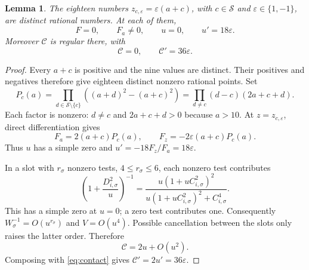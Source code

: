 \documentclass[11pt,a4paper]{article}
\newtheorem{lemma}[theorem]{Lemma}
\begin{document}
\begin{lemma}\label{lem:contacts}
The eighteen numbers $z_{c,\varepsilon}=\varepsilon(a+c)$,
with $c\in\mathcal S$ and $\varepsilon\in\{1,-1\}$, are
distinct rational numbers. At each of them,
\[
 F=0,\qquad F_a\ne0,\qquad u=0,\qquad u'=18\varepsilon.
\]
Moreover $\mathcal C$ is regular there, with
\[
                       \mathcal C=0,\qquad
                         \mathcal C'=36\varepsilon.
\]
\end{lemma}
\begin{proof}
Every $a+c$ is positive and the nine values are distinct. Their
positives and negatives therefore give eighteen distinct nonzero
rational points. Set
\[
 P_c(a)=\prod_{d\in\mathcal S\setminus\{c\}}
                ((a+d)^2-(a+c)^2)
       =\prod_{d\ne c}(d-c)(2a+c+d).
\]
Each factor is nonzero: $d\ne c$ and $2a+c+d>0$ because $a>10$.
At $z=z_{c,\varepsilon}$, direct differentiation gives
\[
        F_a=2(a+c)P_c(a),\qquad
        F_z=-2\varepsilon(a+c)P_c(a).
\]
Thus $u$ has a simple zero and $u'=-18F_z/F_a=18\varepsilon$.

In a slot with $r_\sigma$ nonzero tests, $4\le r_\sigma\le6$,
each nonzero test contributes
\[
 \left(1+\frac{D_{i,\sigma}^2}{u}\right)^{-1}
 =\frac{u(1+uC_{i,\sigma}^2)^2}
        {u(1+uC_{i,\sigma}^2)^2+C_{i,\sigma}^4}.
\]
This has a simple zero at $u=0$; a zero test contributes one.
Consequently $W_\sigma^{-1}=O(u^{r_\sigma})$ and
$V=O(u^4)$. Possible cancellation between the slots only raises
the latter order. Therefore
\begin{equation}\label{eq:expansion}
                         \mathcal C=2u+O(u^2).
\end{equation}
Composing with \eqref{eq:contact} gives
$\mathcal C'=2u'=36\varepsilon$.
\end{proof}
\end{document}
